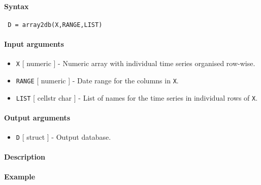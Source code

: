 


	\paragraph{Syntax}
 
 \begin{verbatim}
 D = array2db(X,RANGE,LIST)
 \end{verbatim}
 
 \paragraph{Input arguments}
 
 \begin{itemize}
 \item
   \texttt{X} {[} numeric {]} - Numeric array with individual time series
   organised row-wise.
 \item
   \texttt{RANGE} {[} numeric {]} - Date range for the columns in
   \texttt{X}.
 \item
   \texttt{LIST} {[} cellstr \textbar{} char {]} - List of names for the
   time series in individual rows of \texttt{X}.
 \end{itemize}
 
 \paragraph{Output arguments}
 
 \begin{itemize}
 \item
   \texttt{D} {[} struct {]} - Output database.
 \end{itemize}
 
 \paragraph{Description}
 
 \paragraph{Example}


